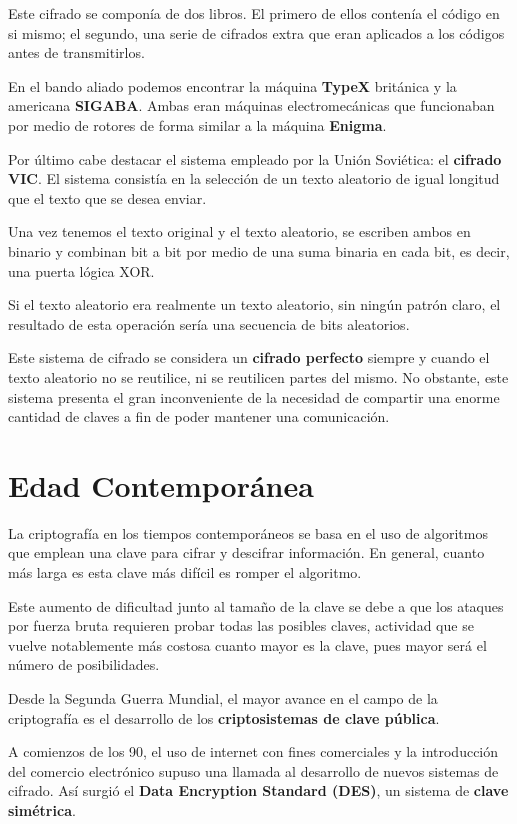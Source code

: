 \documentclass[nochap]{apuntesURJC}
\begin{document}
Este cifrado se componía de dos libros. El primero de ellos contenía el código en si mismo; el segundo, una serie de cifrados extra que eran aplicados a los códigos antes de transmitirlos.

En el bando aliado podemos encontrar la máquina \textbf{TypeX} británica y la americana \textbf{SIGABA}. Ambas eran máquinas electromecánicas que funcionaban por medio de rotores de forma similar a la máquina \textbf{Enigma}.

Por último cabe destacar el sistema empleado por la Unión Soviética: el \textbf{cifrado VIC}. El sistema consistía en la selección de un texto aleatorio de igual longitud que el texto que se desea enviar.

Una vez tenemos el texto original y el texto aleatorio, se escriben ambos en binario y combinan bit a bit por medio de una suma binaria en cada bit, es decir, una puerta lógica XOR.

Si el texto aleatorio era realmente un texto aleatorio, sin ningún patrón claro, el resultado de esta operación sería una secuencia de bits aleatorios.

Este sistema de cifrado se considera un \textbf{cifrado perfecto} siempre y cuando el texto aleatorio no se reutilice, ni se reutilicen partes del mismo. No obstante, este sistema presenta el gran inconveniente de la necesidad de compartir una enorme cantidad de claves a fin de poder mantener una comunicación.

\section{Edad Contemporánea}
La criptografía en los tiempos contemporáneos se basa en el uso de algoritmos que emplean una clave para cifrar y descifrar información. 
%
En general, cuanto más larga es esta clave más difícil es romper el algoritmo.

Este aumento de dificultad junto al tamaño de la clave se debe a que los ataques por fuerza bruta requieren probar todas las posibles claves, actividad que se vuelve notablemente más costosa cuanto mayor es la clave, pues mayor será el número de posibilidades.

Desde la Segunda Guerra Mundial, el mayor avance en el campo de la criptografía es el desarrollo de los \textbf{criptosistemas de clave pública}.

A comienzos de los 90, el uso de internet con fines comerciales y la introducción del comercio electrónico supuso una llamada al desarrollo de nuevos sistemas de cifrado. Así surgió el \textbf{Data Encryption Standard (DES)}, un sistema de \textbf{clave simétrica}.
\end{document}
